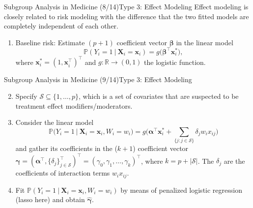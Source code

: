 \documentclass[11pt]{beamer}
\begin{document}
\begin{frame}{Subgroup Analysis in Medicine (8/14)}{Type 3: Effect Modeling}
Effect modeling is closely related to risk modeling with the difference that the two fitted models are completely independent of each other.

\begin{enumerate}
\item Baseline risk: Estimate $(p+1)$ coefficient vector $\bm{\beta}$ in the linear model 
\[
	\mathbb{P}(Y_i=1\ |\  \mathbf{X}_i = \mathbf{x}_i)
	=
	g \Big(\bm{\beta}^\top \mathbf{x}_i^* \Big),
\]
where $\mathbf{x}_i^* = (1, \mathbf{x}_i^\top)^\top$ and $g:\mathbb{R}\to (0,1)$ the logistic function.
\end{enumerate}
\end{frame}

\begin{frame}{Subgroup Analysis in Medicine (9/14)}{Type 3: Effect Modeling}
\begin{enumerate}
\setcounter{enumi}{1}
\item Specify $\mathcal{S} \subseteq \{1,\dots,p\}$, which is a set of covariates that are suspected to be treatment effect modifiers/moderators.
\item Consider the linear model
\[
	\mathbb{P}\Big(Y_i=1\ \Big|\ \mathbf{X}_i = \mathbf{x}_i, W_i = w_i\Big) 
	=
	 g\Bigg(
	 \bm{\alpha}^\top \mathbf{x}_i^*
	 +
	 \sum_{\{j : j \in \mathcal{S}\}} \delta_j w_i x_{ij}
	 \Bigg)
\]
and gather its coefficients in the ($k+1$) coefficient vector $\bm{\gamma} = (\bm{\alpha}^\top, \{\delta_j \}^\top_{j\in \mathcal{S}} )^\top = (\gamma_0, \gamma_1, \dots, \gamma_k)^\top$, where $k = p + |\mathcal{S}|$. 
The $\delta_j$ are the coefficients of interaction terms $w_ix_{ij}$.
\item Fit $\mathbb{P}(Y_i=1\ |\ \mathbf{X}_i = \mathbf{x}_i, W_i = w_i)$ by means of penalized logistic regression (lasso here) and obtain $\bm{\hat{\gamma}}$.
\end{enumerate}
\end{frame}
\end{document}
